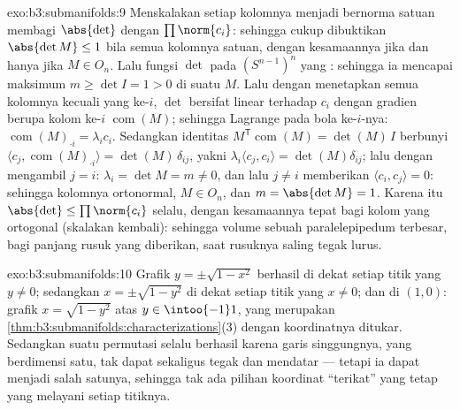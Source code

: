 \begin{solution}{exo:b3:submanifolds:9}
Menskalakan setiap kolomnya menjadi bernorma satuan membagi $\abs{\det}$ dengan
$\prod\norm{c_i}$: sehingga cukup dibuktikan $\abs{\det M} \leq 1$
bila semua kolomnya satuan, dengan kesamaannya jika dan hanya jika $M \in O_n$. Lalu
fungsi $\det$  pada
$(S^{n-1})^n$ yang : sehingga ia mencapai maksimum $m \geq \det I = 1 > 0$
di suatu $M$. Lalu dengan menetapkan semua kolomnya kecuali yang ke-$i$, $\det$ bersifat
linear terhadap $c_i$ dengan gradien berupa kolom ke-$i$
$\operatorname{com}(M)$; sehingga Lagrange pada bola ke-$i$-nya:
$\operatorname{com}(M)_{\cdot i} = \lambda_i c_i$. Sedangkan identitas
$M^{\mathsf T}\operatorname{com}(M) = \det(M)\,I$
berbunyi $\langle c_j, \operatorname{com}(M)_{\cdot i}\rangle =
\det(M)\,\delta_{ij}$, yakni $\lambda_i\langle c_j,
c_i\rangle = \det(M)\delta_{ij}$; lalu dengan mengambil $j = i$: $\lambda_i
= \det M = m \neq 0$, dan lalu $j \neq i$ memberikan $\langle c_i,
c_j\rangle = 0$: sehingga kolomnya ortonormal, $M \in O_n$, dan
$m = \abs{\det M} = 1$. Karena itu $\abs{\det} \leq
\prod\norm{c_i}$ selalu, dengan kesamaannya tepat bagi kolom yang
ortogonal (skalakan kembali): sehingga volume sebuah paralelepipedum terbesar,
bagi panjang rusuk yang diberikan, saat rusuknya saling tegak lurus.
\end{solution}

\begin{solution}{exo:b3:submanifolds:10}
Grafik $y = \pm\sqrt{1 - x^2}$ berhasil di dekat setiap titik yang $y \neq
0$; sedangkan $x = \pm\sqrt{1 - y^2}$ di dekat setiap titik yang $x \neq 0$;
dan di $(1, 0)$: grafik $x = \sqrt{1 - y^2}$ atas $y \in
\intoo{-1}1$, yang merupakan
\cref{thm:b3:submanifolds:characterizations}(3) dengan
koordinatnya ditukar. Sedangkan suatu permutasi selalu berhasil karena
garis singgungnya, yang berdimensi satu, tak dapat sekaligus
tegak dan mendatar --- tetapi ia dapat menjadi salah satunya, sehingga
tak ada pilihan koordinat ``terikat'' yang tetap yang
melayani setiap titiknya.
\end{solution}

